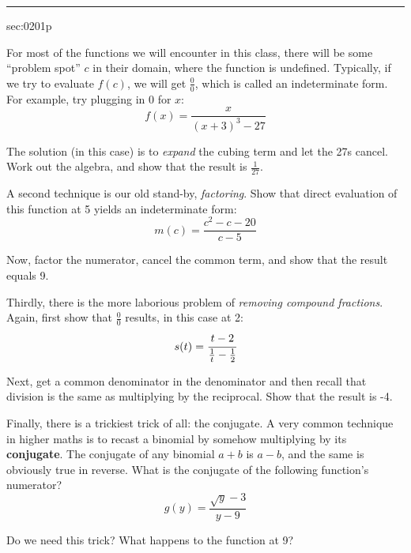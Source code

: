 \renewcommand{\columnseprule}{1.5pt}
\begin{multicols*}{2}
\rule[0.5\baselineskip]{0.4\textwidth}{1pt}
\noindent
{}\label{sec:0201p}
\begin{exercises}{sec:0201p}

\lab[0201Lab1] For most of the functions we will encounter in this class, there will be some 
``problem spot'' $c$ in their domain, where the function is undefined.  Typically, if 
we try to evaluate $f(c)$, we will get $\frac{0}{0}$, which is called an 
\gls{indeterminate form}.  For example, try plugging in 0 for $x$:
$$
f(x)=\frac{x}{(x+3)^3-27}
$$

\vspace{1cm}
\lab[0201Lab2] The solution (in this case) is to \emph{expand} the cubing term and let the 27s cancel.  
Work out the algebra, and show that the result
is $\frac{1}{27}$.

\vspace{2cm}
\lab[0201Lab3] A second technique is our old stand-by, \emph{factoring}.  Show that direct 
evaluation of this function at 5 yields an indeterminate form:
$$
m(c) = \frac{c^2-c-20}{c-5}
$$

\vspace{1cm}
\lab[0201Lab4] Now, factor the numerator, cancel the common term, and show that the result equals 9.

\vspace{2cm}
\lab[0201Lab5] Thirdly, there is the more laborious problem of \emph{removing compound fractions}.  
Again, first show that $\frac{0}{0}$ results, in this case at 2:
$$
s(t)=\cfrac{t-2}{\frac{1}{t}-\frac{1}{2}}
$$

\vspace{1cm}
\lab[0201Lab6]  Next, get a common denominator in the denominator and then recall that division is the 
same as multiplying by the reciprocal.  Show that the result is -4.

\vspace{2cm}
\lab[0201Lab7] Finally, there is a trickiest trick of all: the conjugate.  A very common technique in 
higher maths is to recast a binomial by somehow multiplying by its \textbf{conjugate}.  
 The conjugate of any binomial $a+b$ is $a-b$, and the same is obviously
true in reverse.  What is the conjugate of the following function's numerator?
$$
g(y) = \frac{\sqrt{y}-3}{y-9}
$$

\vspace{1cm}
\lab[0201Lab8]  Do we need this trick?  What happens to the function at 9?


\end{exercises}
\end{multicols*}

